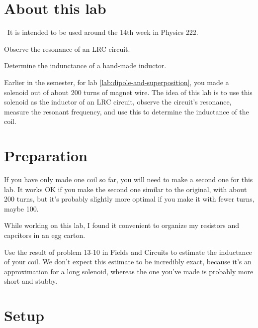 \renewcommand\thechapter{c2.14}
\label{lab:ac-circuits}

\section*{About this lab}

\covid\ 
It is intended to be used around the 14th week in Physics 222.

\apparatus
{}

\begin{goals}

\item[] Observe the resonance of an LRC circuit.

\item[] Determine the indunctance of a hand-made inductor.
\end{goals}

\introduction

Earlier in the semester, for lab \ref{lab:dipole-and-superposition}, you 
made a solenoid out of about 200 turns of magnet wire. The idea of this
lab is to use this solenoid as the inductor of an LRC circuit, observe
the circuit's resonance, measure the resonant frequency, and use this
to determine the inductance of the coil.

\section*{Preparation}

If you have only made one coil so far, you will need to make a second one
for this lab. It works OK if you make the second one similar to the original,
with about 200 turns, but it's probably slightly more optimal if you make it
with fewer turns, maybe 100.

While working on this lab, I found it convenient to organize my resistors
and capcitors in an egg carton.

Use the result of problem 13-10 in Fields and Circuits to estimate the
inductance of your coil. We don't expect this estimate to be incredibly
exact, because it's an approximation for a long solenoid, whereas the
one you've made is probably more short and stubby.

\section*{Setup}

